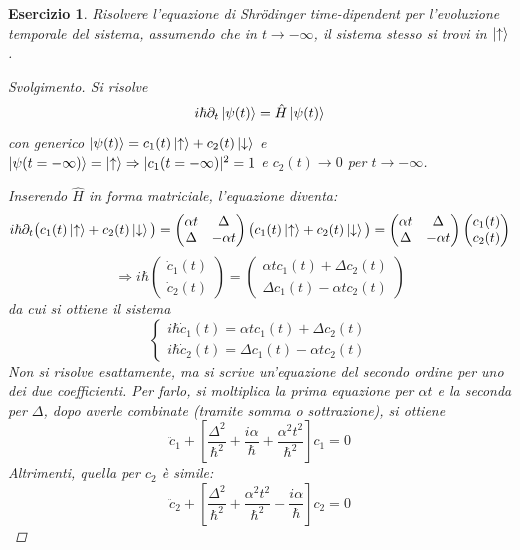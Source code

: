 \documentclass[11pt, a4paper]{scrartcl} %
\numberwithin{equation}{subsection}
\theoremstyle{style2}
\theoremstyle{style1}
\newtheorem{esercizio}{Esercizio}[section]
\renewcommand\qedsymbol{$\blacksquare$}
\newenvironment{svolgimento}{\renewcommand\qedsymbol{$\spadesuit$}\begin{proof}[Svolgimento]}{\end{proof}}
\begin{document}
\begin{esercizio}
	Risolvere l'equazione di Shr\"odinger time-dipendent per l'evoluzione temporale del sistema, assumendo che in $t\to -\infty$, il sistema stesso si trovi in $\ket{\uparrow} $.
	\begin{svolgimento}
		Si risolve
		\[
		i\hbar \partial _t \ket{\psi (t)}  = \hat{H}\ket{\psi (t)} 
		\] 
		con generico $\ket{\psi (t)} = c_1(t) \ket{\uparrow} + c_2(t) \ket{\downarrow} $ e $\ket{\psi (t=-\infty)} = \ket{\uparrow} \Rightarrow  \lvert c_1(t=-\infty) \rvert^2 = 1 $ e $c_2(t) \to 0$ per $t\to -\infty$.

Inserendo $\hat{H}$ in forma matriciale, l'equazione diventa:
\[
		i\hbar \partial _t \big(c_1(t) \ket{\uparrow} + c_2(t) \ket{\downarrow} \big) = \begin{pmatrix} \alpha t & \Delta \\\Delta & -\alpha t \end{pmatrix} \big(c_1(t) \ket{\uparrow} + c_2(t) \ket{\downarrow} \big)=\begin{pmatrix} \alpha t & \Delta \\\Delta & -\alpha t \end{pmatrix} \begin{pmatrix} c_1(t)\\c_2(t) \end{pmatrix}  
		\] 
		\[
		\Rightarrow i\hbar \begin{pmatrix} \dot{c}_1(t) \\ \dot{c}_2(t) \end{pmatrix} = \begin{pmatrix} \alpha t c_1(t) + \Delta c_2(t) \\ \Delta c_1(t) - \alpha  t c_2(t) \end{pmatrix} 
\] 
da cui si ottiene il sistema
\[
\begin{cases}
	i\hbar \dot{c}_1(t) = \alpha t c_1(t) + \Delta c_2(t)\\
	i\hbar \dot{c}_2(t) = \Delta c_1(t) - \alpha t c_2(t)
\end{cases}
\] 
Non si risolve esattamente, ma si scrive un'equazione del secondo ordine per uno dei due coefficienti.
Per farlo, si moltiplica la prima equazione per $\alpha t$ e la seconda per $\Delta $, dopo averle combinate (tramite somma o sottrazione), si ottiene
\[
\ddot{c}_1 + \left[ \frac{\Delta ^2}{\hbar ^2} + \frac{i\alpha }{\hbar }+\frac{\alpha ^2 t^2}{\hbar ^2} \right] c_1 = 0
\] 
Altrimenti, quella per $c_2$ \`e simile:
\[
\ddot{c}_2 + \left[ \frac{\Delta ^2}{\hbar ^2}+\frac{\alpha ^2 t^2}{\hbar ^2}- \frac{i\alpha }{\hbar } \right] c_2 = 0
\]
\end{svolgimento}
\end{esercizio}
\end{document}
